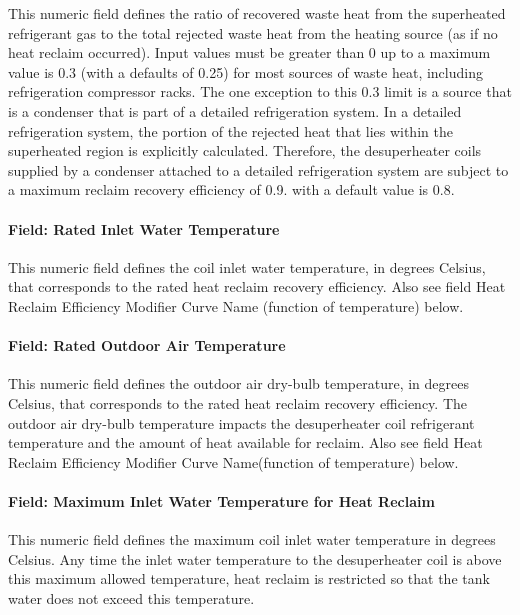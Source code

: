 This numeric field defines the ratio of recovered waste heat from the superheated refrigerant gas to the total rejected waste heat from the heating source (as if no heat reclaim occurred). Input values must be greater than 0 up to a maximum value is 0.3 (with a defaults of 0.25) for most sources of waste heat, including refrigeration compressor racks. The one exception to this 0.3 limit is a source that is a condenser that is part of a detailed refrigeration system. In a detailed refrigeration system, the portion of the rejected heat that lies within the superheated region is explicitly calculated. Therefore, the desuperheater coils supplied by a condenser attached to a detailed refrigeration system are subject to a maximum reclaim recovery efficiency of 0.9. with a default value is 0.8.

\paragraph{Field: Rated Inlet Water Temperature}\label{field-rated-inlet-water-temperature-1}

This numeric field defines the coil inlet water temperature, in degrees Celsius, that corresponds to the rated heat reclaim recovery efficiency. Also see field Heat Reclaim Efficiency Modifier Curve Name (function of temperature) below.

\paragraph{Field: Rated Outdoor Air Temperature}\label{field-rated-outdoor-air-temperature}

This numeric field defines the outdoor air dry-bulb temperature, in degrees Celsius, that corresponds to the rated heat reclaim recovery efficiency. The outdoor air dry-bulb temperature impacts the desuperheater coil refrigerant temperature and the amount of heat available for reclaim. Also see field Heat Reclaim Efficiency Modifier Curve Name(function of temperature) below.

\paragraph{Field: Maximum Inlet Water Temperature for Heat Reclaim}\label{field-maximum-inlet-water-temperature-for-heat-reclaim}

This numeric field defines the maximum coil inlet water temperature in degrees Celsius. Any time the inlet water temperature to the desuperheater coil is above this maximum allowed temperature, heat reclaim is restricted so that the tank water does not exceed this temperature.


